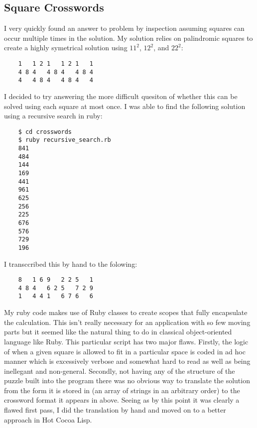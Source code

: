 \documentclass[11pt]{article}
\begin{document}
  
\subsection*{Square Crosswords}
\label{sec-2.1}

   I very quickly found an answer to problem by inspection assuming
   squares can occur multiple times in the solution.  My solution
   relies on palindromic squares to create a highly symetrical
   solution using $11^2$, $12^2$, and $22^2$:
   
\begin{verbatim}
    1   1 2 1   1 2 1   1
    4 8 4   4 8 4   4 8 4
    4   4 8 4   4 8 4   4
\end{verbatim}

   
   I decided to try answering the more difficult quesiton of whether
   this can be solved using each square at most once.  I was able to
   find the following solution using a recursive search in ruby:
   
\begin{verbatim}
    $ cd crosswords
    $ ruby recursive_search.rb
    841
    484
    144
    169
    441
    961
    625
    256
    225
    676
    576
    729
    196
\end{verbatim}

   
   I transccribed this by hand to the folowing:
   
\begin{verbatim}
    8   1 6 9   2 2 5   1
    4 8 4   6 2 5   7 2 9
    1   4 4 1   6 7 6   6
\end{verbatim}

   
   My ruby code makes use of Ruby classes to create scopes that fully
   encapsulate the calculation.  This isn't really necessary for an
   application with so few moving parts but it seemed like the natural
   thing to do in classical object-oriented language like Ruby.  This
   particular script has two major flaws.  Firstly, the logic of when
   a given square is allowed to fit in a particular space is coded in
   ad hoc manner which is excessively verbose and somewhat hard to
   read as well as being inellegant and non-general.  Secondly, not
   having any of the structure of the puzzle built into the program
   there was no obvious way to translate the solution from the form
   it is stored in (an array of strings in an arbitrary order) to the
   crossword format it appears in above.  Seeing as by this point it
   was clearly a flawed first pass, I did the translation by hand and
   moved on to a better approach in Hot Cocoa Lisp.
   
\end{document}
